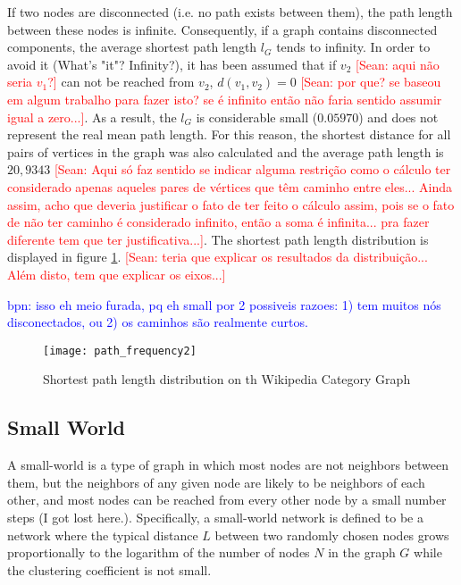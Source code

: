 If two nodes are disconnected (i.e. no path exists between them), the path length between these nodes is infinite. Consequently, if a graph contains disconnected components, the average shortest path length $l_G$ tends to infinity. In order to avoid it (What's "it"? Infinity?), it has been assumed that if $v_2$ \textcolor{red}{[Sean: aqui não seria $v_1$?]} can not be reached from $v_2$, $d(v_{1},v_{2}) = 0$ \textcolor{red}{[Sean: por que? se baseou em algum trabalho para fazer isto? se é infinito então não faria sentido assumir igual a zero...]}. As a result, the $l_G$ is considerable small ($0.05970$) and does not represent the real mean path length. For this reason, the shortest distance for all pairs of vertices in the graph was also calculated and the average path length is $20,9343$ \textcolor{red}{[Sean: Aqui só faz sentido se indicar alguma restrição como o cálculo ter considerado apenas aqueles pares de vértices que têm caminho entre eles... Ainda assim, acho que deveria justificar o fato de ter feito o cálculo assim, pois se o fato de não ter caminho é considerado infinito, então a soma é infinita... pra fazer diferente tem que ter justificativa...]}. The shortest path length distribution is displayed in figure \ref{fig:path-distribution}. \textcolor{red}{[Sean: teria que explicar os resultados da distribuição... Além disto, tem que explicar os eixos...]}

\textcolor{blue}{bpn: isso eh meio furada, pq eh small por 2 possiveis razoes:  1) tem muitos nós disconectados, ou 2) os caminhos são realmente curtos. }

\begin{figure}
  \texttt{[image: path\_frequency2]}
  \caption{Shortest path length distribution on th Wikipedia Category Graph}
  \label{fig:path-distribution}
\end{figure}

\subsection{\hspace*{3pt} Small World}
A small-world is a type of graph in which most nodes are not neighbors between them, but the neighbors of any given node are likely to be neighbors of each other, and most nodes can be reached from every other node by a small number steps (I got lost here.). Specifically, a small-world network is defined to be a network where the typical distance $L$ between two randomly chosen nodes grows proportionally to the logarithm of the number of nodes $N$ in the graph $G$ while the clustering coefficient is not small.

